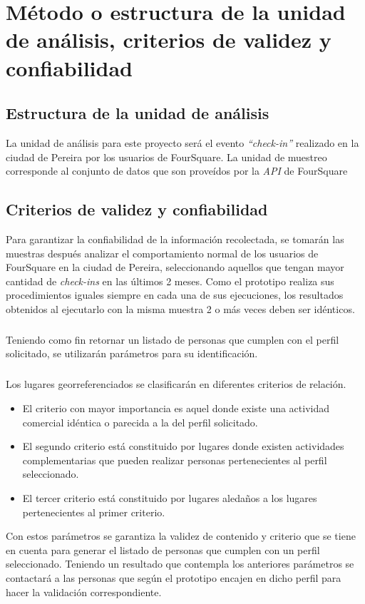 \chapter{M\'etodo o estructura de la unidad de an\'alisis, criterios de validez y confiabilidad}
\label{sec:analisis}
\section{Estructura de la unidad de an\'alisis}
La unidad de an\'alisis para este proyecto ser\'a el evento \textit{“check-in”} realizado en la ciudad de Pereira por los usuarios de FourSquare. La unidad de muestreo corresponde al conjunto de datos que son proveídos por la \textit{API} de FourSquare
\section{Criterios de validez y confiabilidad}
Para garantizar la confiabilidad de la informaci\'on recolectada, se tomar\'an las muestras despu\'es analizar el comportamiento normal de los usuarios de FourSquare en la ciudad de Pereira, seleccionando aquellos que tengan mayor cantidad de \textit{check-ins} en las \'ultimos 2 meses. Como el prototipo realiza sus procedimientos iguales siempre en cada una de sus ejecuciones, los resultados obtenidos al ejecutarlo con la misma muestra 2 o m\'as veces deben ser id\'enticos.
\paragraph{}
Teniendo como fin retornar un listado de personas que cumplen con  el perfil solicitado, se utilizar\'an par\'ametros para su identificaci\'on.
\paragraph{}
Los lugares georreferenciados se clasificar\'an en diferentes criterios de relaci\'on.
\begin{itemize}
\item El criterio con mayor importancia es aquel donde existe una actividad comercial id\'entica o parecida a la del perfil solicitado. 
\item El segundo criterio est\'a constituido por lugares donde existen actividades complementarias que pueden realizar personas pertenecientes al perfil seleccionado.
\item El tercer criterio est\'a constituido por lugares aleda\~nos a los lugares pertenecientes al primer criterio.
\end{itemize}
Con estos par\'ametros se garantiza la validez de contenido y criterio que se tiene en cuenta para generar el listado de personas que cumplen con un perfil seleccionado. Teniendo un resultado que contempla los anteriores par\'ametros se contactar\'a a las personas que seg\'un el prototipo encajen en dicho perfil para hacer la validaci\'on correspondiente.
\pagebreak